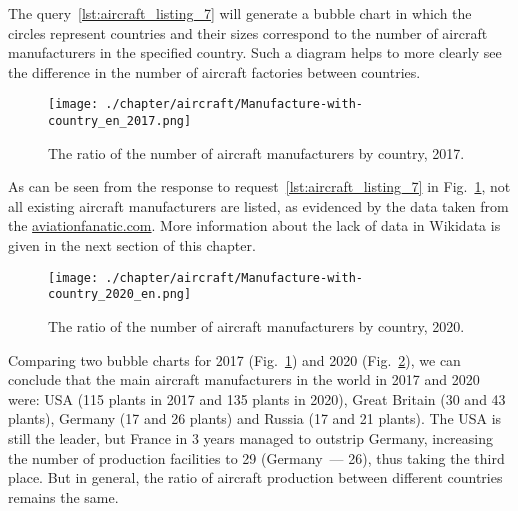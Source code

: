 The query~\ref{lst:aircraft_listing_7} will generate a bubble chart in which the circles represent countries and their sizes correspond to the number 
of aircraft manufacturers in the specified country. Such a diagram helps to more clearly see the difference in the number of aircraft factories 
between countries.

\begin{figure}[h!]
\centering
	\texttt{[image: ./chapter/aircraft/Manufacture-with-country\_en\_2017.png]}
	\caption{The ratio of the number of aircraft manufacturers by country, 2017.}
	\label{fig:Manufacture-with-country_en_2017}
\end{figure}

As can be seen from the response to request~\ref{lst:aircraft_listing_7} in Fig.~\ref{fig:Manufacture-with-country_en_2017}, not all existing 
aircraft manufacturers are listed, as evidenced by the data taken from the \href{https://www.aviationfanatic.com/}{aviationfanatic.com}. 
More information about the lack of data in Wikidata is given in the next section of this chapter. 

\label{question:aircraft_question_4}


\begin{figure}[h!]
\centering
	\texttt{[image: ./chapter/aircraft/Manufacture-with-country\_2020\_en.png]}
	\caption{The ratio of the number of aircraft manufacturers by country, 2020.}
	\label{fig:Manufacture-with-country_2020_en}
\end{figure}


Comparing two bubble charts for 2017 (Fig.~\ref{fig:Manufacture-with-country_en_2017}) and 2020 (Fig.~\ref{fig:Manufacture-with-country_2020_en}), 
we can conclude that the main aircraft manufacturers in the world in 2017 and 2020 were: USA (115 plants in 2017 and 135 plants in 2020), 
Great Britain (30 and 43 plants), Germany (17 and 26 plants) and Russia (17 and 21 plants). The USA is still the leader, but France in 3 years 
managed to outstrip Germany, increasing the number of production facilities to 29 (Germany~--- 26), thus taking the third place. But in general, 
the ratio of aircraft production between different countries remains the same.

